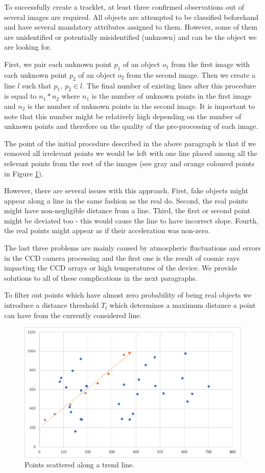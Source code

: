 	To successfully create a tracklet, at least three confirmed observations out of several images are required. All objects are attempted to be classified beforehand and have several mandatory attributes assigned to them. However, some of them are unidentified or potentially misidentified (unknown) and can be the object we are looking for. 
	
	First, we pair each unknown point $p_1$ of an object $o_1$ from the first image with each unknown point $p_2$ of an object $o_2$ from the second image. Then we create a line $l$ such that $p_1,\ p_2 \in l$. The final number of existing lines after this procedure is equal to $n_1 * n_2$ where $n_1$ is the number of unknown points in the first image and $n_2$ is the number of unknown points in the second image. It is important to note that this number might be relatively high depending on the number of unknown points and therefore on the quality of the pre-processing of each image. 
	
	The point of the initial procedure described in the above paragraph is that if we removed all irrelevant points we would be left with one line placed among all the relevant points from the rest of the images (see gray and orange coloured points in Figure \ref{fig:regresia1}).
	
	However, there are several issues with this approach. First, fake objects might appear along a line in the same fashion as the real do. Second, the real points might have non-negligible distance from a line. Third, the first or second point might be deviated too - this would cause the line to have incorrect slope. Fourth, the real points might appear as if their acceleration was non-zero. 
	
	The last three problems are mainly caused by atmospheric fluctuations and errors in the CCD camera processing and the first one is the result of cosmic rays impacting the CCD arrays or high temperatures of the device. We provide solutions to all of these complications in the next paragraphs.
	
	 To filter out points which have almost zero probability of being real objects we introduce a distance threshold $T_l$ which determines a maximum distance a point can have from the currently considered line. 
	
	\begin{figure}[H]
	\centering
	  \includegraphics[width=12cm]{images/regresia1}
		  \caption{Points scattered along a trend line.}
	  \label{fig:regresia1}
	\end{figure}
	
